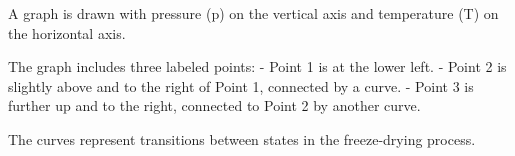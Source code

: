 A graph is drawn with pressure (p) on the vertical axis and temperature (T) on the horizontal axis.  

The graph includes three labeled points:  
- Point 1 is at the lower left.  
- Point 2 is slightly above and to the right of Point 1, connected by a curve.  
- Point 3 is further up and to the right, connected to Point 2 by another curve.  

The curves represent transitions between states in the freeze-drying process.